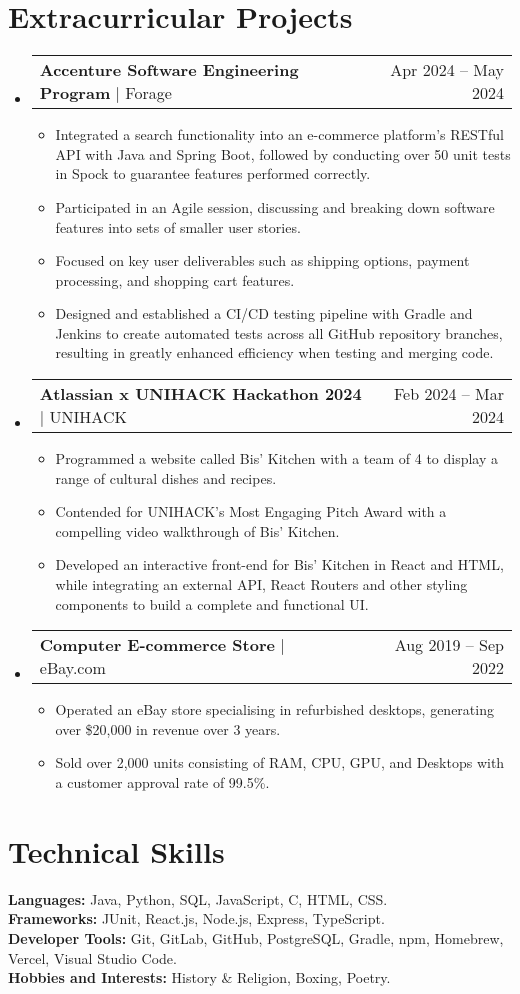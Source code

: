 \documentclass[letterpaper,11pt]{article}
\makeatletter
\newcommand{\resumeItem}[1]{
  \item\small{
    {#1 \vspace{-2pt}}
  }
}
\newcommand{\resumeProjectHeading}[2]{
    \item
    \begin{tabular*}{0.97\textwidth}{l@{\extracolsep{\fill}}r}
      \small#1 & #2 \\
    \end{tabular*}\vspace{-7pt}
}
\newcommand{\resumeSubHeadingListStart}{\begin{itemize}[leftmargin=0.15in, label={}]}
\newcommand{\resumeSubHeadingListEnd}{\end{itemize}}
\newcommand{\resumeItemListStart}{\begin{itemize}}
\newcommand{\resumeItemListEnd}{\end{itemize}\vspace{-5pt}}
\makeatother
\begin{document}
\section{Extracurricular Projects}
    \resumeSubHeadingListStart
        \resumeProjectHeading
          {\textbf{Accenture Software Engineering Program} $|$ {Forage}}{Apr 2024 -- May 2024}
          \resumeItemListStart
            \resumeItem{Integrated a search functionality into an e-commerce platform's RESTful API with Java and Spring Boot, followed by conducting over 50 unit tests in Spock to guarantee features performed correctly.}
            \resumeItem{Participated in an Agile session, discussing and breaking down software features into sets of smaller user stories.}
            \resumeItem{Focused on key user deliverables such as shipping options, payment processing, and shopping cart features.}
            \resumeItem{Designed and established a CI/CD testing pipeline with Gradle and Jenkins to create automated tests across all GitHub repository branches, resulting in greatly enhanced efficiency when testing and merging code.}
          \resumeItemListEnd
      \resumeProjectHeading
          {\textbf{Atlassian x UNIHACK Hackathon 2024} $|$ {UNIHACK}}{Feb 2024 -- Mar 2024}
          \resumeItemListStart
            \resumeItem{Programmed a website called Bis' Kitchen with a team of 4 to display a range of cultural dishes and recipes.}
            \resumeItem{Contended for UNIHACK's Most Engaging Pitch Award with a compelling video walkthrough of Bis’ Kitchen.}
            \resumeItem{Developed an interactive front-end for Bis' Kitchen in React and HTML, while integrating an external API, React Routers and other styling components to build a complete and functional UI.}
          \resumeItemListEnd
      \resumeProjectHeading
          {\textbf{Computer E-commerce Store} $|$ {eBay.com}}{Aug 2019 -- Sep 2022}
          \resumeItemListStart
            \resumeItem{Operated an eBay store specialising in refurbished desktops, generating over \$20,000 in revenue over 3 years.}
            \resumeItem{Sold over 2,000 units consisting of RAM, CPU, GPU, and Desktops with a customer approval rate of 99.5\%.}
          \resumeItemListEnd
    \resumeSubHeadingListEnd


%
\section{Technical Skills}
 \begin{itemize}[leftmargin=0.15in, label={}]
    \small{\item{
     \textbf{Languages:}{ Java, Python, SQL, JavaScript, C, HTML, CSS.} \\
     \textbf{Frameworks:}{ JUnit, React.js, Node.js, Express, TypeScript.} \\
     \textbf{Developer Tools:}{ Git, GitLab, GitHub, PostgreSQL, Gradle, npm, Homebrew, Vercel, Visual Studio Code.} \\
     \textbf{Hobbies and Interests:}{ History \& Religion, Boxing, Poetry.}
    }}
 \end{itemize}


\end{document}
